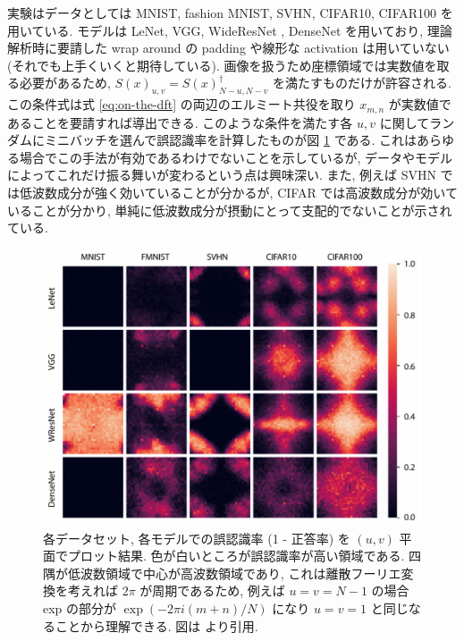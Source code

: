 実験はデータとしては MNIST, fashion MNIST, SVHN, CIFAR10, CIFAR100 を用いている.
モデルは LeNet, VGG, WideResNet \cite{zagoruyko2016wide}, DenseNet を用いており, 理論解析時に要請した wrap around の padding や線形な activation は用いていない (それでも上手くいくと期待している).
画像を扱うため座標領域では実数値を取る必要があるため, $S(x)_{u,v} = S(x)^{\dagger}_{N - u, N - v}$ を満たすものだけが許容される.
この条件式は式 \ref{eq:on-the-dft} の両辺のエルミート共役を取り $x_{m,n}$ が実数値であることを要請すれば導出できる.
このような条件を満たす各 $u, v$ に関してランダムにミニバッチを選んで誤認識率を計算したものが図 \ref{fig:on-the-uvplane} である.
これはあらゆる場合でこの手法が有効であるわけでないことを示しているが, データやモデルによってこれだけ振る舞いが変わるという点は興味深い.
また, 例えば SVHN では低波数成分が強く効いていることが分かるが, CIFAR では高波数成分が効いていることが分かり, 単純に低波数成分が摂動にとって支配的でないことが示されている.
%
\begin{figure}[htbp]
\begin{center}
\includegraphics[width=12.0cm]{figures/on-the-uvplane.pdf}
\end{center}
\caption{
各データセット, 各モデルでの誤認識率 (1 - 正答率) を $(u, v)$ 平面でプロット結果.
色が白いところが誤認識率が高い領域である.
四隅が低波数領域で中心が高波数領域であり, これは離散フーリエ変換を考えれば $2 \pi$ が周期であるため, 例えば $u = v = N - 1$ の場合 exp の部分が $\exp (- 2 \pi i (m + n) / N)$ になり $u = v = 1$ と同じなることから理解できる.
図は \cite{tsuzuku2019structural} より引用.
}
\label{fig:on-the-uvplane}
\end{figure}
%

